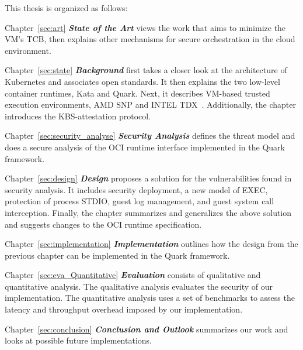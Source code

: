 This thesis is organized as follows:

\begin{hangparas}{.25in}{1} 

Chapter~\ref{see:art} \textit{\textbf{State of the Art}} views the work that aims to minimize the VM's TCB, then explains other mechanisms for secure orchestration in the cloud environment. 

Chapter~\ref{sec:state} \textit{\textbf{Background}} first takes a closer look at the architecture of Kubernetes\cite*{k8s} and associates open standards. It then explains the two low-level container runtimes, Kata and Quark. Next, it describes VM-based trusted execution environments, AMD SNP\cite*{SEV_SNP_white_book} and INTEL TDX~\cite*{Intel_tdx_whitepaper}. Additionally, the chapter 
introduces the KBS-attestation protocol.

Chapter~\ref{sec:security_analyse} \textit{\textbf{Security Analysis}} defines the threat model and does a secure analysis of the OCI runtime interface implemented in the Quark framework.

Chapter~\ref{sec:design} \textit{\textbf{Design}} proposes a solution for the vulnerabilities found in security analysis. It includes security deployment, a new model of EXEC, protection of process STDIO, guest log management, and guest system call interception. Finally, the chapter summarizes and generalizes the above solution and suggests changes to the OCI runtime specification.

Chapter~\ref{sec:implementation} \textit{\textbf{Implementation}} outlines how the design from the previous chapter can be implemented in the Quark framework.

Chapter~\ref{sec:eva_Quantitative} \textit{\textbf{Evaluation}} consists of qualitative and quantitative analysis. The qualitative analysis evaluates the security of our implementation. The quantitative analysis uses a set of benchmarks to assess the latency and throughput overhead imposed by our implementation.

Chapter~\ref{sec:conclusion} \textit{\textbf{Conclusion and Outlook}} summarizes our work and looks at possible future implementations.

\end{hangparas}

\cleardoublepage

